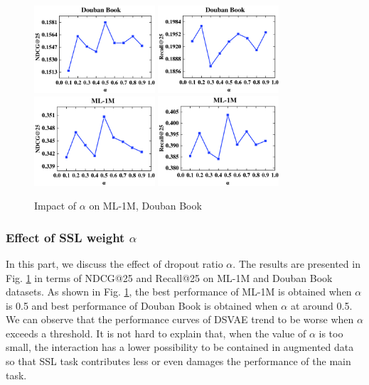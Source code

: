 \begin{figure}[!htb]
\centering
{\label{lambda}
    \includegraphics[width=0.4\textwidth]{fig/par/9.pdf}
    \includegraphics[width=0.4\textwidth]{fig/par/10.pdf}
    \includegraphics[width=0.4\textwidth]{fig/par/11.pdf}
    \includegraphics[width=0.4\textwidth]{fig/par/12.pdf}}

\caption{Impact of $\alpha$ on ML-1M, Douban Book } \label{alpha}
\end{figure}

\subsubsection{Effect of SSL weight $\alpha$}\label{subsubsec2}

In this part, we discuss the effect of dropout ratio $\alpha$. The results are presented in Fig. \ref{alpha} in terms of NDCG@25 and Recall@25 on ML-1M and Douban Book datasets. As shown in Fig. \ref{alpha}, the best performance of ML-1M is obtained when $\alpha$ is 0.5 and best performance of Douban Book is obtained when $\alpha$ at around 0.5. We can observe that the performance curves of DSVAE trend to be worse when $\alpha$ exceeds a threshold.  It is not hard to explain that, when the value of $\alpha$ is too small, the interaction has a lower possibility to be contained in augmented data so that SSL task contributes less or even damages the performance of the main task.

